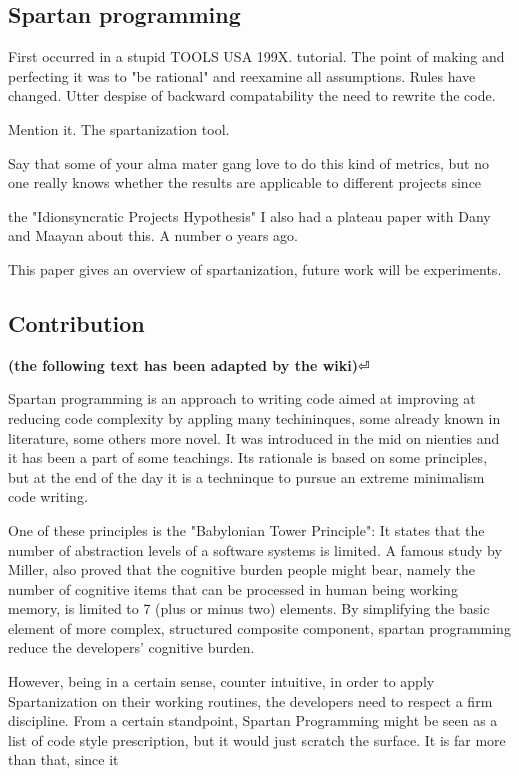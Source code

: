 \subsection{Spartan programming}
First occurred in a stupid TOOLS USA 199X. tutorial.
The point of making and perfecting it was to "be rational" and
reexamine all assumptions.
Rules have changed.
Utter despise of backward compatability the need to rewrite the code.

Mention it. The spartanization tool.

Say that some of your alma mater gang love to do this kind of metrics, but
no one really knows whether the results are applicable to different projects
since
\cite{Turnu:Concas:Marchesi:Tonelli:11}

the "Idionsyncratic Projects Hypothesis" I also had a plateau paper with
Dany and Maayan about this. A number o years ago.

This paper gives an overview of spartanization, future work will be
experiments.

\subsection{Contribution}

\textbf{(the following text has been adapted by the wiki)}⏎

Spartan programming is an approach to writing code aimed at improving at
reducing code complexity by appling many techininques, some already known in
literature, some others more novel. It was introduced in the mid on nienties
and it has been a part of some teachings. Its rationale is based on some
principles, but at the end of the day it is a techninque to pursue an extreme
minimalism code writing.

One of these principles is the "Babylonian Tower Principle": It states that the
number of abstraction levels of a software systems is limited. A famous study
by Miller, also proved that the cognitive burden people might bear, namely the
number of cognitive items that can be processed in human being working memory,
is limited to 7 (plus or minus two) elements. By simplifying the basic element
of more complex, structured composite component, spartan programming reduce the
developers' cognitive burden.

However, being in a certain sense, counter intuitive, in order to apply
Spartanization on their working routines, the developers need to respect a firm
discipline. From a certain standpoint, Spartan Programming might be seen as a
list of code style prescription, but it would just scratch the surface. It is
far more than that, since it

